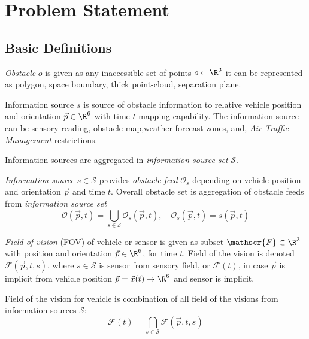 \chapter{Problem Statement}


\section{Basic Definitions}\label{s:basicDefinitions}
    \begin{definition}{\emph{Obstacle} $o$} is given as any inaccessible set of points $o\subset\R^3$ it can be represented as polygon, space boundary, thick point-cloud, separation plane.
    \end{definition}
    
    \begin{definition}{Information source $s$}\label{def:informationSource} is source of obstacle information to relative vehicle position and orientation $\vec{p}\in\R^6$ with time $t$ mapping capability. The information source can be sensory reading, obstacle map,weather forecast zones, and, \emph{Air Traffic Management} restrictions.
    
    Information sources are aggregated in \emph{information source set} $\mathscr{S}$.
    
    \emph{Information source} $s\in\mathscr{S}$ provides \emph{obstacle feed} $\mathscr{O}_s$ depending on vehicle position and orientation $\vec{p}$ and time $t$. Overall obstacle set is aggregation of obstacle feeds from \emph{information source set}
    \begin{equation}\label{eq:obstacleSet}
        \mathscr{O}(\vec{p},t)=\bigcup_{s\in\mathscr{S}} \mathscr{O}_s(\vec{p},t), \quad \mathscr{O}_s(\vec{p},t)=s(\vec{p},t)
    \end{equation}
    \end{definition}
    
    \begin{definition}{\emph{Field of vision}}\label{def:} (FOV) of vehicle or sensor is given as subset $\mathscr{F}\subset\R^3$ with position and orientation $\vec{p}\in\R^6$, for time $t$. Field of the vision is denoted $\mathscr{F}(\vec{p},t,s)$, where $s\in\mathscr{S}$ is sensor from sensory field, or $\mathscr{F}(t)$, in case $\vec{p}$ is implicit from vehicle position $\vec{p}=\vec{x}(t)\to\R^6$ and sensor is implicit.
    \end{definition}
    
    \begin{note} Field of the vision for vehicle is combination of all field of the visions from information sources $\mathscr{S}$:
    \begin{equation}\label{eq:fieldOfVisonFixedTime}
        \mathscr{F}(t)=\bigcap_{s\in\mathscr{S}} \mathscr{F}(\vec{p},t,s)
    \end{equation}
    \end{note}
    
